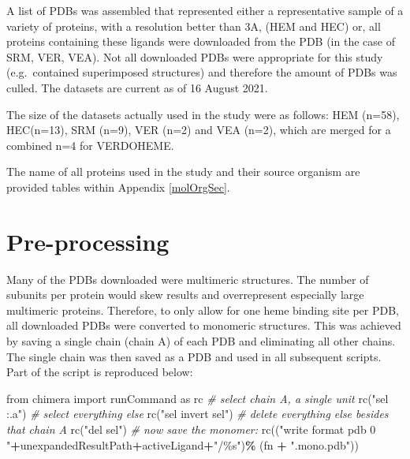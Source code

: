 \documentclass[a4paper, nobind]{templates/ociamthesis}
\newenvironment{Shaded}{\begin{snugshade}}{\end{snugshade}}
\newcommand{\CommentTok}[1]{\textcolor[rgb]{0.56,0.35,0.01}{\textit{#1}}}
\newcommand{\ImportTok}[1]{#1}
\newcommand{\NormalTok}[1]{#1}
\newcommand{\OperatorTok}[1]{\textcolor[rgb]{0.81,0.36,0.00}{\textbf{#1}}}
\newcommand{\SpecialCharTok}[1]{\textcolor[rgb]{0.00,0.00,0.00}{#1}}
\newcommand{\StringTok}[1]{\textcolor[rgb]{0.31,0.60,0.02}{#1}}
\renewenvironment{Shaded}
{
  \vspace{10pt}%
  \begin{snugshade}%
}{%
  \end{snugshade}%
  \vspace{8pt}%
}
\begin{document}
\noindent A list of PDBs was assembled that represented either a representative sample of a variety of proteins, with a resolution better than 3A, (HEM and HEC) or, all proteins containing these ligands were downloaded from the PDB (in the case of SRM, VER, VEA). Not all downloaded PDBs were appropriate for this study (e.g.~contained superimposed structures) and therefore the amount of PDBs was culled. The datasets are current as of 16 August 2021.

The size of the datasets actually used in the study were as follows: HEM (n=58), HEC(n=13), SRM (n=9), VER (n=2) and VEA (n=2), which are merged for a combined n=4 for VERDOHEME.

The name of all proteins used in the study and their source organism are provided tables within Appendix \ref{molOrgSec}.

\hypertarget{pre-processing}{%
\section{Pre-processing}\label{pre-processing}}

Many of the PDBs downloaded were multimeric structures. The number of subunits per protein would skew results and overrepresent especially large multimeric proteins. Therefore, to only allow for one heme binding site per PDB, all downloaded PDBs were converted to monomeric structures. This was achieved by saving a single chain (chain A) of each PDB and eliminating all other chains. The single chain was then saved as a PDB and used in all subsequent scripts. Part of the script is reproduced below:

\begin{Shaded}
\begin{Highlighting}[]
\ImportTok{from}\NormalTok{ chimera }\ImportTok{import}\NormalTok{ runCommand }\ImportTok{as}\NormalTok{ rc}
\CommentTok{\# select chain A, a single unit}
\NormalTok{rc(}\StringTok{"sel :.a"}\NormalTok{)}
\CommentTok{\# select everything else}
\NormalTok{rc(}\StringTok{"sel invert sel"}\NormalTok{)}
\CommentTok{\# delete everything else besides that chain A}
\NormalTok{rc(}\StringTok{"del sel"}\NormalTok{)}
\CommentTok{\# now save the monomer:}
\NormalTok{rc((}\StringTok{"write format pdb 0 "}\OperatorTok{+}\NormalTok{unexpandedResultPath}\OperatorTok{+}\NormalTok{activeLigand}\OperatorTok{+}\StringTok{"/}\SpecialCharTok{\%s}\StringTok{"}\NormalTok{)}\OperatorTok{\%}
\NormalTok{  (fn }\OperatorTok{+} \StringTok{".mono.pdb"}\NormalTok{))}
\end{Highlighting}
\end{Shaded}
\end{document}
